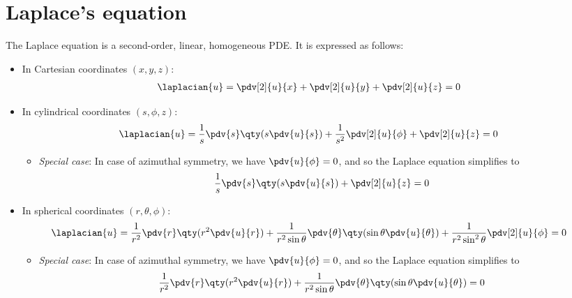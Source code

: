 \section{Laplace's equation}
    The Laplace equation is a second-order, linear, homogeneous PDE. It is expressed as follows:
    \begin{itemize}
        \item In Cartesian coordinates $(x,y,z)$:
        \begin{align*}
            \laplacian{u}&=\pdv[2]{u}{x}+\pdv[2]{u}{y}+\pdv[2]{u}{z}=0
        \end{align*}

        \item In cylindrical coordinates $(s,\phi,z)$:
        \begin{align*}
            \laplacian{u}&=\dfrac{1}{s}\pdv{s}\qty(s\pdv{u}{s})+\dfrac{1}{s^2}\pdv[2]{u}{\phi}+\pdv[2]{u}{z}=0
        \end{align*}
        \begin{itemize}
            \item \textit{Special case}: In case of azimuthal symmetry, we have $\pdv{u}{\phi}=0$, and so the Laplace equation simplifies to
            \begin{align*}
                \dfrac{1}{s}\pdv{s}\qty(s\pdv{u}{s})+\pdv[2]{u}{z}=0
            \end{align*}
        \end{itemize}

        \item In spherical coordinates $(r,\theta,\phi)$:
        \begin{align*}
            \laplacian{u}&=\dfrac{1}{r^2}\pdv{r}\qty(r^2\pdv{u}{r})+\dfrac{1}{r^2\sin{\theta}}\pdv{\theta}\qty(\sin{\theta}\pdv{u}{\theta})+\dfrac{1}{r^2\sin^2{\theta}}\pdv[2]{u}{\phi}=0
        \end{align*}
        \begin{itemize}
            \item \textit{Special case}: In case of azimuthal symmetry, we have $\pdv{u}{\phi}=0$, and so the Laplace equation simplifies to
            \begin{align*}
                \dfrac{1}{r^2}\pdv{r}\qty(r^2\pdv{u}{r})+\dfrac{1}{r^2\sin{\theta}}\pdv{\theta}\qty(\sin{\theta}\pdv{u}{\theta})=0
            \end{align*}
        \end{itemize}
    \end{itemize}

